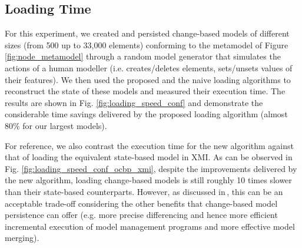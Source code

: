\documentclass{llncs}
\begin{document}
\subsection{Loading Time}
\label{subsec:loading_time_test}

For this experiment, we created and persisted change-based models of different sizes (from 500 up to 33,000 elements) conforming to the metamodel of Figure \ref{fig:node_metamodel} through a random model generator that simulates the actions of a human modeller (i.e. creates/deletes elements, sets/unsets values of their features). We then used the proposed and the naive loading algorithms to reconstruct the state of these models and measured their execution time. The results are shown in Fig. \ref{fig:loading_speed_conf} and demonstrate the considerable time savings delivered by the proposed loading algorithm (almost 80\% for our largest models).

For reference, we also contrast the execution time for the new algorithm against that of loading the equivalent state-based model in XMI. As can be observed in Fig. \ref{fig:loading_speed_conf_ocbp_xmi}, despite the improvements delivered by the new algorithm, loading change-based models is still roughly 10 times slower than their state-based counterparts. However, as discussed in\,\cite{yohannis2017turning}, this can be an acceptable trade-off considering the other benefits that change-based model persistence can offer (e.g. more precise differencing and hence more efficient incremental execution of model management programs and more effective model merging).
\end{document}
